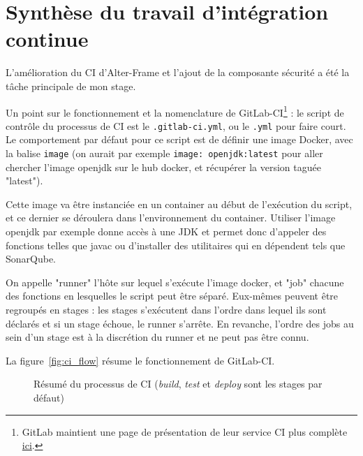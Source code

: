 \section{Synthèse du travail d'intégration continue}
\label{sec:synthese_ci}
L'amélioration du CI d'Alter-Frame et l'ajout de la composante sécurité a été la tâche principale de mon stage.

Un point sur le fonctionnement et la nomenclature de GitLab-CI\footnote{GitLab maintient une page de présentation de leur service CI plus complète \href{https://about.gitlab.com/2016/10/25/gitlab-workflow-an-overview/}{ici}.} : le script de contrôle du processus de CI est le \texttt{.gitlab-ci.yml}, ou le \texttt{.yml} pour faire court. Le comportement par défaut pour ce script est de définir une image Docker, avec la balise \texttt{image} (on aurait par exemple \texttt{image: openjdk:latest} pour aller chercher l'image openjdk sur le hub docker, et récupérer la version taguée "latest").

Cette image va être instanciée en un container au début de l'exécution du script, et ce dernier se déroulera dans l'environnement du container. Utiliser l'image openjdk par exemple donne accès à une JDK et permet donc d'appeler des fonctions telles que javac ou d'installer des utilitaires qui en dépendent tels que SonarQube. 

On appelle "runner" l'hôte sur lequel s'exécute l'image docker, et "job" chacune des fonctions en lesquelles le script peut être séparé. Eux-mêmes peuvent être regroupés en stages : les stages s'exécutent dans l'ordre dans lequel ils sont déclarés et si un stage échoue, le runner s'arrête. En revanche, l'ordre des jobs au sein d'un stage est à la discrétion du runner et ne peut pas être connu. 

La figure~\ref{fig:ci_flow} résume le fonctionnement de GitLab-CI. 

\begin{figure}
  \centering
  \caption{Résumé du processus de CI (\emph{build}, \emph{test} et \emph{deploy} sont les stages par défaut)}
  \label{fig:ci_process}
\end{figure}

